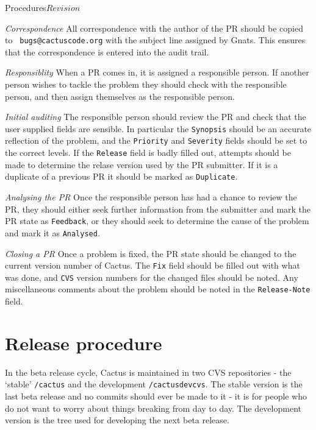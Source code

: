 \begin{cactuspart}{2}{Procedures}{}{$Revision$}
\begin{Lentry}
\item[{\em Correspondence}]
All correspondence with the author of the PR should be copied to {\tt
\verb,bugs@cactuscode.org,} with the subject line assigned by Gnats.
This ensures that the correspondence is entered into the audit trail.
\item[{\em Responsiblity}]
When a PR comes in, it is assigned a responsible person.  If another
person wishes to tackle the problem they should check with the
responsible person, and then assign themselves as the responsible
person.
\item[{\em Initial auditing}]
The responsible person should review the PR and check that the user
supplied fields are sensible.  In particular the {\tt Synopsis} should
be an accurate reflection of the problem, and the {\tt Priority} and
{\tt Severity} fields should be set to the correct levels.  If the
{\tt Release} field is badly filled out, attempts should be made to
determine the relase version used by the PR submitter.  If it is a
duplicate of a previous PR it should be marked as {\tt Duplicate}.
\item[{\em Analysing the PR}]
Once the responsible person has had a chance to review the PR, they
should either seek further information from the submitter and mark the 
PR state as {\tt Feedback}, or they should seek to determine the cause 
of the problem and mark it as {\tt Analysed}.
\item[{\em Closing a PR}]
Once a problem is fixed, the PR state should be changed to the current 
version number of Cactus.  The {\tt Fix} field should be filled out
with what was done, and {\tt CVS} version numbers for the changed
files should be noted.  Any miscellaneous comments about the problem
should be noted in the {\tt Release-Note} field.
\end{Lentry}


\chapter{Release procedure}

In the beta release cycle, Cactus is maintained in two CVS
repositories - the `stable' \verb./cactus. and the development
\verb./cactusdevcvs..  The stable version is the last beta release and 
no commits should ever be made to it - it is for people who do not
want to worry about things breaking from day to day.  The development
version is the tree used for developing the next beta release.


\end{cactuspart}
